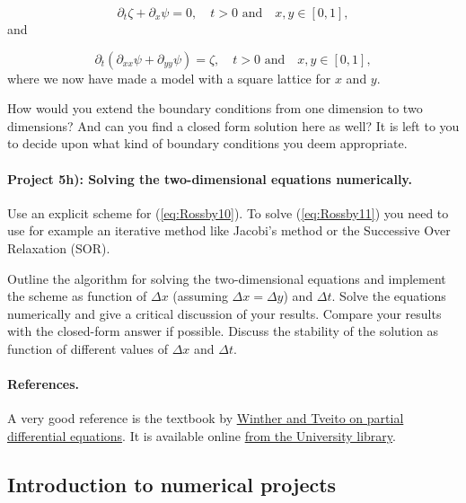 \documentclass[%
oneside,                 %
final,                   %
10pt]{article}
\begin{document}
\begin{equation}
  \label{eq:Rossby10}
	\partial_t\zeta + \partial_x\psi = 0, \quad \textrm{$t > 0$ and} \quad x,y\in [0,1],
\end{equation}
and

\begin{equation}
  \label{eq:Rossby11}
	\partial_t\left( \partial_{xx}\psi + \partial_{yy}\psi \right) = \zeta, \quad \textrm{$t > 0$ and} \quad x,y\in [0,1],
\end{equation}
where we now have made a model with a square lattice for $x$ and $y$.

How would you extend the boundary conditions from one dimension to two
dimensions? And can you find a closed form solution here as well?  It
is left to you to decide upon what kind of boundary conditions you
deem appropriate.

\paragraph{Project 5h): Solving the two-dimensional equations numerically.}
Use an explicit scheme for (\ref{eq:Rossby10}). To solve
(\ref{eq:Rossby11}) you need to use for example an iterative method
like Jacobi's method or the Successive Over Relaxation (SOR).

Outline the algorithm for solving the two-dimensional equations and
implement the scheme as function of $\Delta x$ (assuming $\Delta x =
\Delta y$) and $\Delta t$. Solve the equations numerically and give a
critical discussion of your results. Compare your results with the
closed-form answer if possible. Discuss the stability of the solution
as function of different values of $\Delta x$ and $\Delta t$.


\paragraph{References.}
A very good reference is the textbook by \href{{http://www.springer.com/us/book/9783540225515}}{Winther and Tveito on partial differential equations}. It is available online \href{{https://vpn2.uio.no/+CSCO+0h756767633A2F2F797661782E66636576617472652E70627A++/book/10.1007/b138016/page/1}}{from the University library}.


\subsection*{Introduction to numerical projects}
\end{document}
